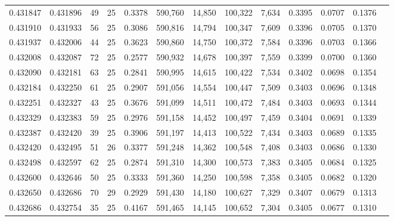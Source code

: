 \begin{tabular}{rrrrrrrrrrrrr}
0.431847 & 0.431896 &    49 &  25 &                                     0.3378 & 590,760 &  14,850 & 100,322 &   7,634 & 0.3395 & 0.0707 & 0.1376 \\
0.431910 & 0.431933 &    56 &  25 &                                     0.3086 & 590,816 &  14,794 & 100,347 &   7,609 & 0.3396 & 0.0705 & 0.1370 \\
0.431937 & 0.432006 &    44 &  25 &                                     0.3623 & 590,860 &  14,750 & 100,372 &   7,584 & 0.3396 & 0.0703 & 0.1366 \\
0.432008 & 0.432087 &    72 &  25 &                                     0.2577 & 590,932 &  14,678 & 100,397 &   7,559 & 0.3399 & 0.0700 & 0.1360 \\
0.432090 & 0.432181 &    63 &  25 &                                     0.2841 & 590,995 &  14,615 & 100,422 &   7,534 & 0.3402 & 0.0698 & 0.1354 \\
0.432184 & 0.432250 &    61 &  25 &                                     0.2907 & 591,056 &  14,554 & 100,447 &   7,509 & 0.3403 & 0.0696 & 0.1348 \\
0.432251 & 0.432327 &    43 &  25 &                                     0.3676 & 591,099 &  14,511 & 100,472 &   7,484 & 0.3403 & 0.0693 & 0.1344 \\
0.432329 & 0.432383 &    59 &  25 &                                     0.2976 & 591,158 &  14,452 & 100,497 &   7,459 & 0.3404 & 0.0691 & 0.1339 \\
0.432387 & 0.432420 &    39 &  25 &                                     0.3906 & 591,197 &  14,413 & 100,522 &   7,434 & 0.3403 & 0.0689 & 0.1335 \\
0.432420 & 0.432495 &    51 &  26 &                                     0.3377 & 591,248 &  14,362 & 100,548 &   7,408 & 0.3403 & 0.0686 & 0.1330 \\
0.432498 & 0.432597 &    62 &  25 &                                     0.2874 & 591,310 &  14,300 & 100,573 &   7,383 & 0.3405 & 0.0684 & 0.1325 \\
0.432600 & 0.432646 &    50 &  25 &                                     0.3333 & 591,360 &  14,250 & 100,598 &   7,358 & 0.3405 & 0.0682 & 0.1320 \\
0.432650 & 0.432686 &    70 &  29 &                                     0.2929 & 591,430 &  14,180 & 100,627 &   7,329 & 0.3407 & 0.0679 & 0.1313 \\
0.432686 & 0.432754 &    35 &  25 &                                     0.4167 & 591,465 &  14,145 & 100,652 &   7,304 & 0.3405 & 0.0677 & 0.1310 \\

\end{tabular}
